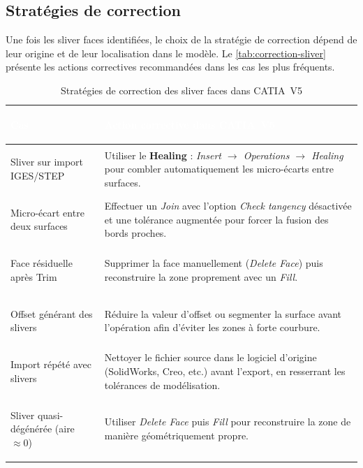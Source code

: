 \subsection{Stratégies de correction}

Une fois les sliver faces identifiées, le choix de la stratégie de correction dépend de leur origine et de leur localisation dans le modèle. Le \autoref{tab:correction-sliver} présente les actions correctives recommandées dans les cas les plus fréquents.

\begin{table}[H]
    \centering
    \caption{Stratégies de correction des sliver faces dans CATIA~V5}
    \label{tab:correction-sliver}
    \begin{tabularx}{\textwidth}{|>{\bfseries\raggedright\arraybackslash}p{3.8cm}|X|}
        \hline
        \rowcolor{headerblue}
        \textcolor{white}{\textbf{Cas}} & \centering\textcolor{white}{\textbf{Action corrective dans CATIA~V5}} \tabularnewline
        \hline
        \rowcolor{rowlight}
        Sliver sur import IGES/STEP & Utiliser le \textbf{Healing} : \textit{Insert $\rightarrow$ Operations $\rightarrow$ Healing} pour combler automatiquement les micro-écarts entre surfaces. \\
        \hline
        \rowcolor{rowwhite}
        Micro-écart entre deux surfaces & Effectuer un \textit{Join} avec l'option \textit{Check tangency} désactivée et une tolérance augmentée pour forcer la fusion des bords proches. \\
        \hline
        \rowcolor{rowlight}
        Face résiduelle après Trim & Supprimer la face manuellement (\textit{Delete Face}) puis reconstruire la zone proprement avec un \textit{Fill}. \\
        \hline
        \rowcolor{rowwhite}
        Offset générant des slivers & Réduire la valeur d'offset ou segmenter la surface avant l'opération afin d'éviter les zones à forte courbure. \\
        \hline
        \rowcolor{rowlight}
        Import répété avec slivers & Nettoyer le fichier source dans le logiciel d'origine (SolidWorks, Creo, etc.) avant l'export, en resserrant les tolérances de modélisation. \\
        \hline
        \rowcolor{rowwhite}
        Sliver quasi-dégénérée (aire $\approx 0$) & Utiliser \textit{Delete Face} puis \textit{Fill} pour reconstruire la zone de manière géométriquement propre. \\
        \hline
    \end{tabularx}
\end{table}


